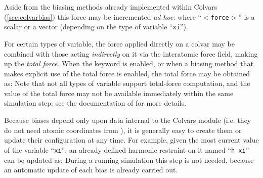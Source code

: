 {Aside from the biasing methods already implemented within Colvars (\ref{sec:colvarbias}) this force may be incremented \emph{ad hoc}\ifdefined{}\fi:
\noindent{}where ``\texttt{$<$force$>$}'' is a scalar or a vector (depending on the type of variable ``\texttt{xi}'').

For certain types of variable, the force applied directly on a colvar may be combined with those acting \emph{indirectly} on it via the interatomic force field, making up the \emph{total force}.
When the  keyword is enabled, or when a biasing method that makes explicit use of the total force is enabled,  the total force may be obtained as:
\noindent{}Note that not all types of variable support total-force computation, and the value of the total force may not be available immediately within the same simulation step: see the documentation of  for more details.

\ifdefined{}\fi



Because biases depend only upon data internal to the Colvars module (i.e.{} they do not need atomic coordinates from \MDENGINE{}), it is generally easy to create them or update their configuration at any time.
For example, given the most current value of the variable ``\texttt{xi}'', an already-defined harmonic restraint on it named ``\texttt{h\_xi}'' can be updated as:
\noindent{}During a running simulation this step is not needed, because an automatic update of each bias is already carried out.

}
